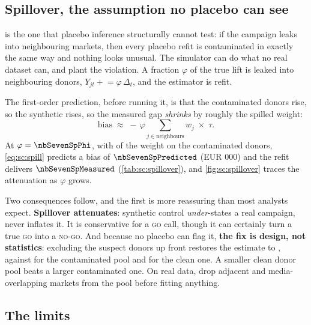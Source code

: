 

\subsection*{Spillover, the assumption no placebo can see}

 is the one that placebo inference structurally cannot test: if the campaign
leaks into neighbouring markets, then every placebo refit is contaminated in exactly the same way
and nothing looks unusual. The simulator can do what no real dataset can, and plant the violation.
A fraction $\varphi$ of the true lift is leaked into \nbSevenSpNNeighbours{} neighbouring donors,
$Y_{jt} \mathrel{+}= \varphi\,\Delta_t$, and the estimator is refit.

The first-order prediction, before running it, is that the contaminated donors rise, so the
synthetic rises, so the measured gap \emph{shrinks} by roughly the spilled weight:
%
\begin{equation}
  \text{bias} \;\approx\; -\,\varphi \sum_{j \in \text{neighbours}} w_j \;\times\; \tau .
  \label{eq:sc:spill}
\end{equation}
%
At $\varphi = \nbSevenSpPhi$, with \pc{\nbSevenSpNeighbourWeight} of the weight on the
contaminated donors, \cref{eq:sc:spill} predicts a bias of $\nbSevenSpPredicted$ (EUR 000) and
the refit delivers $\nbSevenSpMeasured$ (\cref{tab:sc:spillover}), and \cref{fig:sc:spillover} traces
the attenuation as $\varphi$ grows.




Two consequences follow, and the first is more reassuring than most analysts expect.
\textbf{Spillover attenuates}: synthetic control \emph{under}-states a real campaign, never
inflates it. It is conservative for a \textsc{go} call, though it can certainly turn a true
\textsc{go} into a \textsc{no-go}. And because no placebo can flag it, \textbf{the fix is design,
not statistics}: excluding the suspect donors up front restores the estimate to
\keur{\nbSevenSpExcluded}, against \keur{\nbSevenSpContaminated} for the contaminated pool and
\keur{\nbSevenSpClean} for the clean one. A smaller clean donor pool beats a larger contaminated
one. On real data, drop adjacent and media-overlapping markets from the pool before fitting
anything.

\subsection*{The limits}

